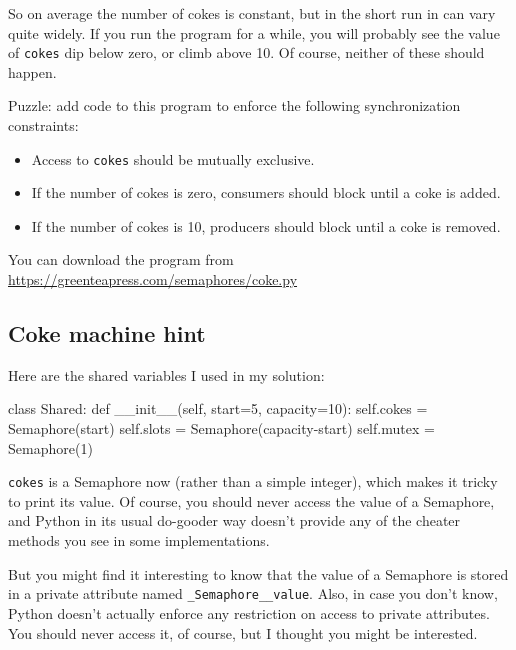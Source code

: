 \documentclass{book}
\begin{document}
So on average the number of cokes is constant, but in the short
run in can vary quite widely.  If you run the program for a
while, you will probably see the value of {\tt cokes} dip
below zero, or climb above 10.  Of course, neither of these
should happen.

Puzzle: add code to this program to enforce the following
synchronization constraints:

\begin{itemize}

    \item Access to {\tt cokes} should be mutually exclusive.

    \item If the number of cokes is zero, consumers should block
          until a coke is added.

    \item If the number of cokes is 10, producers should block
          until a coke is removed.

\end{itemize}

You can download the program from
\url{https://greenteapress.com/semaphores/coke.py}



\subsection {Coke machine hint}

Here are the shared variables I used in my solution:

\begin{unbreakable}[title={}]{}
class Shared:
 def __init__(self, start=5, capacity=10):
  self.cokes = Semaphore(start)
  self.slots = Semaphore(capacity-start)
  self.mutex = Semaphore(1)
\end{unbreakable}

{\tt cokes} is a Semaphore now (rather than a simple integer),
which makes it tricky to print its value.  Of course, you
should never access the value of a Semaphore, and Python in
its usual do-gooder way doesn't provide any of the cheater
methods you see in some implementations.

But you might find it interesting to know that the value
of a Semaphore is stored in a private attribute named
    {\tt \_Semaphore\_\_value}.  Also, in case you don't know,
Python doesn't actually enforce any restriction on access to
private attributes.  You should never access it, of course,
but I thought you might be interested.
\end{document}
